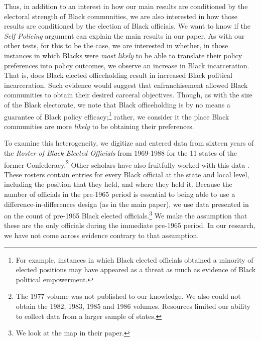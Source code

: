 \documentclass[12pt]{article}
\begin{document}
Thus, in addition to an interest in how our main results are conditioned by the electoral strength of Black communities, we are also interested in how those results are conditioned by the election of Black officials.  We want to know if the \emph{Self Policing} argument can explain the main results in our paper.  As with our other tests, for this to be the case, we are interested in whether, in those instances in which Blacks were \emph{most likely} to be able to translate their policy preferences into policy outcomes, we observe an increase in Black incarceration.  That is, does Black elected officeholding result in increased Black political incarceration.  Such evidence would suggest that enfranchisement allowed Black communities to obtain their desired carceral objectives.  Though, as with the size of the Black electorate, we note that Black officeholding is by no means a guarantee of Black policy efficacy;\footnote{For example, instances in which Black elected officials obtained a minority of elected positions may have appeared as a threat as much as evidence of Black political empowerment. } rather, we consider it the place Black communities are more \emph{likely} to be obtaining their preferences.


To examine this heterogeneity, we digitize and entered data from sixteen years of the \emph{Roster of Black Elected Officials} from 1969-1988 for the 11 states of the former Confederacy.\footnote{The 1977 volume was not published to our knowledge.  We also could not obtain the 1982, 1983, 1985 and 1986 volumes.  Resources limited our ability to collect data from a larger sample of states.}  Other scholars have also fruitfully worked with this data . These rosters contain entries for every Black official at the state and local level, including the position that they held, and where they held it.  Because the number of officials in the pre-1965 period is essential to being able to use a difference-in-differences design (as in the main paper), we use data presented in  on the count of pre-1965 Black elected officials.\footnote{We look at the map in their paper.}  We make the assumption that these are the only officials during the immediate pre-1965 period.  In our research, we have not come across evidence contrary to that assumption.
\end{document}
